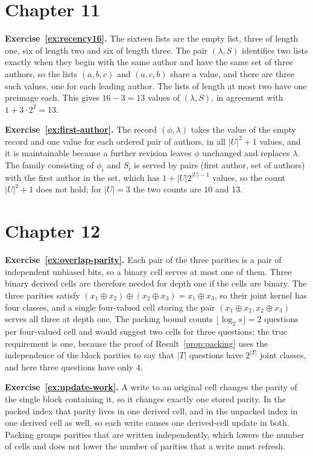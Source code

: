 \section*{Chapter 11}

\textbf{Exercise~\ref{ex:recency16}.} The sixteen lists are the empty list, three of length one, six of length two and six of length three. The pair $(\lambda,S)$ identifies two lists exactly when they begin with the same author and have the same set of three authors, so the lists $(a,b,c)$ and $(a,c,b)$ share a value, and there are three such values, one for each leading author. The lists of length at most two have one preimage each. This gives $16-3=13$ values of $(\lambda,S)$, in agreement with $1+3\cdot2^{2}=13$.

\textbf{Exercise~\ref{ex:first-author}.} The record $(\phi,\lambda)$ takes the value of the empty record and one value for each ordered pair of authors, in all $|U|^{2}+1$ values, and it is maintainable because a further revision leaves $\phi$ unchanged and replaces $\lambda$. The family consisting of $\phi_i$ and $S_i$ is served by pairs (first author, set of authors) with the first author in the set, which has $1+|U|2^{|U|-1}$ values, so the count $|U|^{2}+1$ does not hold; for $|U|=3$ the two counts are $10$ and $13$.

\section*{Chapter 12}

\textbf{Exercise~\ref{ex:overlap-parity}.} Each pair of the three parities is a pair of independent unbiased bits, so a binary cell serves at most one of them. Three binary derived cells are therefore needed for depth one if the cells are binary. The three parities satisfy $(x_1\oplus x_2)\oplus(x_2\oplus x_3)=x_1\oplus x_3$, so their joint kernel has four classes, and a single four-valued cell storing the pair $(x_1\oplus x_2,x_2\oplus x_3)$ serves all three at depth one. The packing bound counts $\lfloor\log_2 s\rfloor=2$ questions per four-valued cell and would suggest two cells for three questions; the true requirement is one, because the proof of Result~\ref{prop:packing} uses the independence of the block parities to say that $|T|$ questions have $2^{|T|}$ joint classes, and here three questions have only $4$.

\textbf{Exercise~\ref{ex:update-work}.} A write to an original cell changes the parity of the single block containing it, so it changes exactly one stored parity. In the packed index that parity lives in one derived cell, and in the unpacked index in one derived cell as well, so each write causes one derived-cell update in both. Packing groups parities that are written independently, which lowers the number of cells and does not lower the number of parities that a write must refresh.

